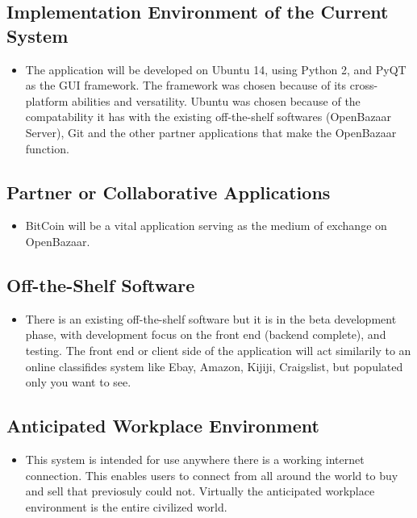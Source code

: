 \documentclass{article}
\begin{document}
\subsection{Implementation Environment of the Current System}

\begin{itemize}
\item
The application will be developed on Ubuntu 14, using Python 2, and PyQT as the GUI framework. The framework was chosen because of its cross-platform abilities and versatility. Ubuntu was chosen because of the compatability it has with the existing off-the-shelf softwares (OpenBazaar Server), Git and the other partner applications that make the OpenBazaar function. 
\end{itemize}

\subsection{Partner or Collaborative Applications}
\begin{itemize}

\item
BitCoin will be a vital application serving as the medium of exchange on OpenBazaar.

\end{itemize}

\subsection{Off-the-Shelf Software}
\begin{itemize}
	
\item
There is an existing off-the-shelf software but it is in the beta development phase, with development focus on the front end (backend complete), and testing. The front end or client side of the application will act similarily to an online classifides system like Ebay, Amazon, Kijiji, Craigslist, but populated only you want to see.	

	
\end{itemize}

\subsection{Anticipated Workplace Environment}
\begin{itemize}
	
\item
This system is intended for use anywhere there is a working internet connection. This enables users to connect from all around the world to buy and sell that previosuly could not. Virtually the anticipated workplace environment is the entire civilized world.
	
	
\end{itemize}
\end{document}
